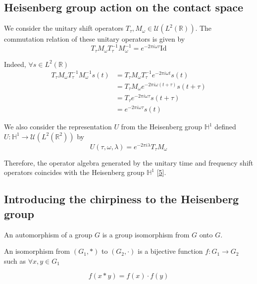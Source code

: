 \documentclass[american,]{article}
\theoremstyle{definition}
\theoremstyle{definition}
\theoremstyle{definition}
\theoremstyle{remark}
\begin{document}
\hypertarget{heisenberg-group-action-on-the-contact-space}{%
\subsection{Heisenberg group action on the contact space}\label{heisenberg-group-action-on-the-contact-space}}

We consider the unitary shift operators \(T_\tau,M_\omega\in\mathcal{U}(L^2(\mathbb{R}))\).
The commutation relation of these unitary operators is given by
\begin{equation}
T_\tau M_\omega T_\tau^{-1} M_\omega^{-1} = e^{-2\pi i\omega\tau} \mathrm{Id}
\end{equation}

Indeed, \(\forall s\in L^2(\mathbb{R})\)
\begin{align}
T_\tau M_\omega T_\tau^{-1} M_\omega^{-1} s(t)
&= T_\tau M_\omega T_\tau^{-1} e^{-2\pi i\omega t} s(t)\\ 
&= T_\tau M_\omega e^{-2\pi i\omega(t+\tau)} s(t+\tau)\\ 
&= T_\tau e^{-2\pi i\omega\tau} s(t+\tau)\\ 
&= e^{-2\pi i\omega\tau} s(t)
\end{align}

We also consider the representation \(U\) from the Heisenberg group \(\mathbb{H}^1\)
defined \(U:\mathbb{H}^1\rightarrow\mathcal{U}(L^2(\mathbb{R}^2))\) by
\begin{equation}
U(\tau,\omega,\lambda) = e^{-2\pi i\lambda}T_\tau M_\omega
\end{equation}

Therefore, the operator algebra generated by the unitary time and frequency shift
operators coincides with the Heisenberg group \(\mathbb{H}^1\) {[}\protect\hyperlink{ref-boscain2021}{5}{]}.

\hypertarget{introducing-the-chirpiness-to-the-heisenberg-group}{%
\subsection{Introducing the chirpiness to the Heisenberg group}\label{introducing-the-chirpiness-to-the-heisenberg-group}}

An automorphism of a group \(G\) is a group isomorphism from \(G\) onto \(G\).

An isomorphism from \((G_1,*)\) to \((G_2,\cdot)\) is a bijective function
\(f:G_1\rightarrow G_2\) such as \(\forall x,y\in G_1\)

\begin{equation}
f(x*y) = f(x)\cdot f(y)
\end{equation}
\end{document}
